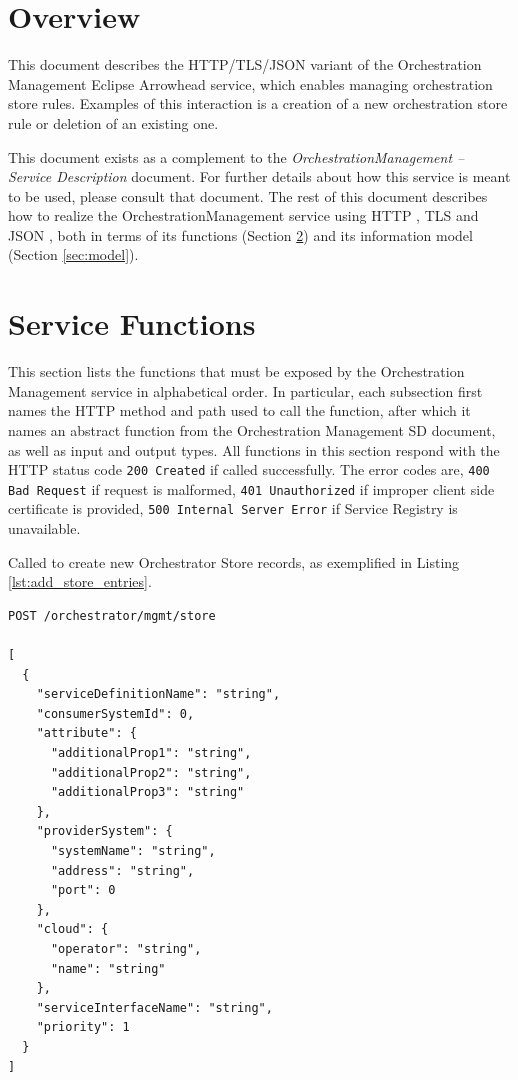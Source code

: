 \documentclass[a4paper]{arrowhead}
\newcommand{\fref}[1]{{\textcolor{ArrowheadBlue}{\hyperref[sec:functions:#1]{#1}}}}
\begin{document}
\section{Overview}
\label{sec:overview}

This document describes the HTTP/TLS/JSON variant of the Orchestration Management Eclipse Arrowhead service, which enables managing orchestration store rules.
Examples of this interaction is a creation of a new orchestration store rule or deletion of an existing one.

This document exists as a complement to the \textit{OrchestrationManagement -- Service Description} document.
For further details about how this service is meant to be used, please consult that document.
The rest of this document describes how to realize the OrchestrationManagement service using HTTP \cite{fielding2014hypertext}, TLS \cite{rescorla2018transport} and JSON \cite{bray2014json}, both in terms of its functions (Section \ref{sec:functions}) and its information model (Section \ref{sec:model}).

\newpage

\section{Service Functions}
\label{sec:functions}

This section lists the functions that must be exposed by the Orchestration Management service in alphabetical order.
In particular, each subsection first names the HTTP method and path used to call the function, after which it names an abstract function from the Orchestration Management SD document, as well as input and output types.
All functions in this section respond with the HTTP status code \texttt{200 Created} if called successfully. The error codes are, \texttt{400 Bad Request} if request is malformed, \texttt{401 Unauthorized} if improper client side certificate is provided, \texttt{500 Internal Server Error} if Service Registry is unavailable.


Called to create new Orchestrator Store records, as exemplified in Listing \ref{lst:add_store_entries}.

\begin{lstlisting}[language=http,label={lst:add_store_entries},caption={An \fref{Add Store Entries} invocation.}]
POST /orchestrator/mgmt/store

[
  {
    "serviceDefinitionName": "string",
    "consumerSystemId": 0,
    "attribute": {
      "additionalProp1": "string",
      "additionalProp2": "string",
      "additionalProp3": "string"
    },
    "providerSystem": {
      "systemName": "string",
      "address": "string",
      "port": 0
    },
    "cloud": {
      "operator": "string",
      "name": "string"
    },
    "serviceInterfaceName": "string",
    "priority": 1
  }
]
\end{lstlisting}
\end{document}
